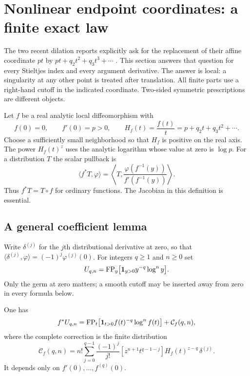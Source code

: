 \section{Nonlinear endpoint coordinates: a finite exact law}
\label{xid:sec:nonlinear}

The two recent dilation reports explicitly ask for the replacement of
their affine coordinate $pt$ by $pt+q_2t^2+q_3t^3+\cdots$
\cite{IncomingMellin,IncomingIdentities}.  This section answers that
question for every Stieltjes index and every argument derivative.  The
answer is local: a singularity at any other point is treated after
translation.  All finite parts use a right-hand cutoff in the indicated
coordinate.  Two-sided symmetric prescriptions are different objects.

Let $f$ be a real analytic local diffeomorphism with
\begin{equation}\label{xid:eq:f-germ}
 f(0)=0,\qquad f'(0)=p>0,\qquad
 H_f(t)=\frac{f(t)}t=p+q_2t+q_3t^2+\cdots.
\end{equation}
Choose a sufficiently small neighborhood so that $H_f$ is positive on
the real axis.  The power $H_f(t)^z$ uses the analytic logarithm whose
value at zero is $\log p$.  For a distribution $T$ the scalar pullback is
\begin{equation}\label{xid:eq:pullback-definition}
 \langle f^*T,\varphi\rangle
 =\left\langle T,
 \frac{\varphi(f^{-1}(y))}{f'(f^{-1}(y))}\right\rangle.
\end{equation}
Thus $f^*T=T\circ f$ for ordinary functions.  The Jacobian in this
definition is essential.

\subsection{A general coefficient lemma}

Write $\delta^{(j)}$ for the $j$th distributional derivative at zero,
so that $\langle\delta^{(j)},\varphi\rangle=(-1)^j\varphi^{(j)}(0)$.
For integers $q\ge1$ and $n\ge0$ set
\[
 U_{q,n}=\operatorname{FP}_y\bigl[\mathbf1_{y>0}y^{-q}\log^n y\bigr].
\]
Only the germ at zero matters; a smooth cutoff may be inserted away
from zero in every formula below.

\begin{theorem}
\label{xid:thm:coordinate-monomial}
One has
\begin{equation}\label{xid:eq:coordinate-monomial}
 f^*U_{q,n}
 =\operatorname{FP}_t\bigl[\mathbf1_{t>0}f(t)^{-q}\log^n f(t)\bigr]
       +\mathcal C_f(q,n),
\end{equation}
where the complete correction is the finite distribution
\begin{equation}\label{xid:eq:C-generator}
 \mathcal C_f(q,n)
 =n!\sum_{j=0}^{q-1}\frac{(-1)^j}{j!}
   [z^{n+1}t^{q-1-j}]H_f(t)^{z-q}\,\delta^{(j)}.
\end{equation}
It depends only on $f'(0),\ldots,f^{(q)}(0)$.
\end{theorem}

